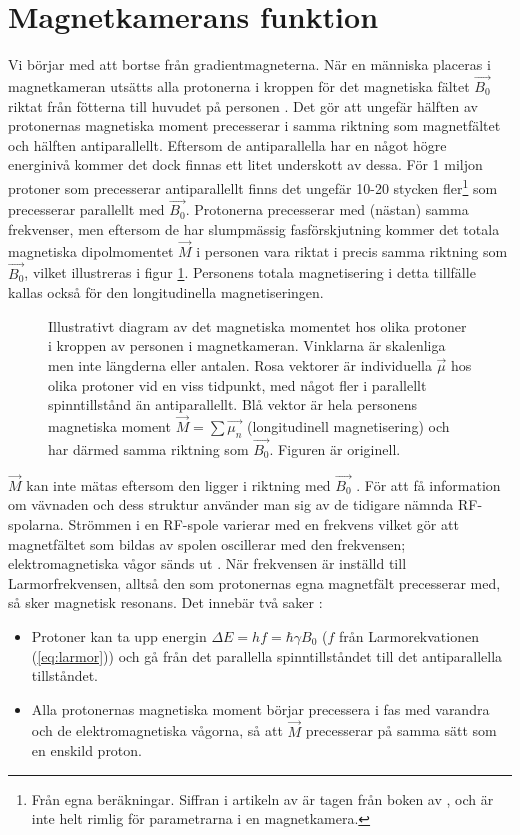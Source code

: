 \documentclass[11pt, a4paper]{article}
\begin{document}
\section{Magnetkamerans funktion}
Vi börjar med att bortse från gradientmagneterna. När en människa placeras i magnetkameran utsätts alla protonerna i kroppen för det magnetiska fältet $\vec{B_0}$ riktat från fötterna till huvudet på personen \parencite{understanding_mri}. Det gör att ungefär hälften av protonernas magnetiska moment precesserar i samma riktning som magnetfältet och hälften antiparallellt. Eftersom de antiparallella har en något högre energinivå kommer det dock finnas ett litet underskott av dessa. För 1 miljon protoner som precesserar antiparallellt finns det ungefär 10-20 stycken fler\footnote{Från egna beräkningar. Siffran i artikeln av \textcite{understanding_mri} är tagen från boken  av \textcite{mri_made_easy}, och är inte helt rimlig för parametrarna i en magnetkamera.} som precesserar parallellt med $\vec{B_0}$. Protonerna precesserar med (nästan) samma frekvenser, men eftersom de har slumpmässig fasförskjutning kommer det totala magnetiska dipolmomentet $\vec{M}$ i personen vara riktat i precis samma riktning som $\vec{B_0}$, vilket illustreras i figur \ref{fig:spinn_vektorer}. Personens totala magnetisering i detta tillfälle kallas också för den longitudinella magnetiseringen.

\begin{figure}[ht]
	\centering
	
	\caption{Illustrativt diagram av det magnetiska momentet hos olika protoner i kroppen av personen i magnetkameran. Vinklarna är skalenliga men inte längderna eller antalen. Rosa vektorer är individuella $\vec{\mu}$ hos olika protoner vid en viss tidpunkt, med något fler i parallellt spinntillstånd än antiparallellt. Blå vektor är hela personens magnetiska moment $\vec{M}=\sum{\vec{\mu_n}}$ (longitudinell magnetisering) och har därmed samma riktning som $\vec{B_0}$. Figuren är originell.}
	\label{fig:spinn_vektorer}
\end{figure}

$\vec{M}$ kan inte mätas eftersom den ligger i riktning med $\vec{B_0}$ \parencite{understanding_mri}. För att få information om vävnaden och dess struktur använder man sig av de tidigare nämnda RF-spolarna. Strömmen i en RF-spole varierar med en frekvens vilket gör att magnetfältet som bildas av spolen oscillerar med den frekvensen; elektromagnetiska vågor sänds ut \parencite{mri_for_radiologists}. När frekvensen är inställd till Larmorfrekvensen, alltså den som protonernas egna magnetfält precesserar med, så sker magnetisk resonans. Det innebär två saker \parencite{understanding_mri}:
\begin{itemize}
	\item Protoner kan ta upp energin $\Delta E=hf=\hbar\gamma B_0$ ($f$ från Larmorekvationen (\ref{eq:larmor})) och gå från det parallella spinntillståndet till det antiparallella tillståndet.
	\item Alla protonernas magnetiska moment börjar precessera i fas med varandra och de elektromagnetiska vågorna, så att $\vec{M}$ precesserar på samma sätt som en enskild proton.
\end{itemize}
\end{document}
